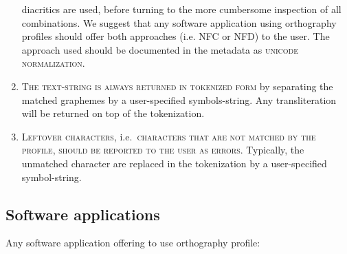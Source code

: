 \begin{enumerate}
       diacritics are used, before turning to the more cumbersome inspection of
       all combinations. We suggest that any software application using
       orthography profiles should offer both approaches (i.e. \textsc{NFC} or
       \textsc{NFD}) to the user. The approach used should be documented in the
       metadata as \textsc{unicode normalization}. 
	\item \textsc{The text-string is always returned in tokenized form} by
       separating the matched graphemes by a user-specified symbols-string. Any
       transliteration will be returned on top of the tokenization. 
	\item \textsc{Leftover characters}, i.e.~\textsc{characters that are not
       matched by the profile, should be reported to the user as errors.}
       Typically, the unmatched character are replaced in the tokenization by a
       user-specified symbol-string.       
 \end{enumerate}

\subsection*{Software applications}

Any software application offering to use orthography profile:

